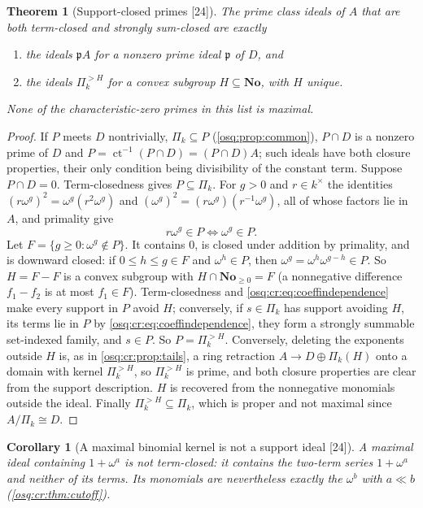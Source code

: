 \documentclass[11pt,letterpaper]{article}
\numberwithin{equation}{section}
\newtheorem{theorem}{Theorem}[section]
\newtheorem{corollary}[corollary]{Corollary}
\theoremstyle{definition}
\theoremstyle{remark}
\theoremstyle{plain}
\newcommand{\No}{\mathbf{No}}
\newcommand{\ct}{\operatorname{ct}}
\newcommand{\src}[1]{\textup{\textsf{[#1]}}}
\begin{document}
\begin{theorem}[Support-closed primes \src{24}]\label{osq:cr:thm:termprimes}
The prime class ideals of $A$ that are both term-closed and strongly sum-closed are exactly
\begin{enumerate}
\item the ideals $\mathfrak pA$ for a nonzero prime ideal $\mathfrak p$ of $D$, and
\item the ideals $\Pi_k^{>H}$ for a convex subgroup $H\subseteq\No$, with $H$ unique.
\end{enumerate}
None of the characteristic-zero primes in this list is maximal.
\end{theorem}
\begin{proof}
If $P$ meets $D$ nontrivially, $\Pi_k\subseteq P$ (\cref{osq:prop:common}), $P\cap D$ is a nonzero prime of $D$ and $P=\ct^{-1}(P\cap D)=(P\cap D)A$;
such ideals have both closure properties, their only condition being divisibility of the constant term. Suppose $P\cap D=0$. Term-closedness gives
$P\subseteq\Pi_k$. For $g>0$ and $r\in k^\times$ the identities $(r\omega^g)^2=\omega^g(r^2\omega^g)$ and $(\omega^g)^2=(r\omega^g)(r^{-1}\omega^g)$, all of
whose factors lie in $A$, and primality give
\begin{equation}\label{osq:cr:eq:coeffindependence}
 r\omega^g\in P\iff\omega^g\in P .
\end{equation}
Let $F=\{g\ge0:\omega^g\notin P\}$. It contains $0$, is closed under addition by primality, and is downward closed: if $0\le h\le g\in F$ and
$\omega^h\in P$, then $\omega^g=\omega^h\omega^{g-h}\in P$. So $H=F-F$ is a convex subgroup with $H\cap\No_{\ge0}=F$ (a nonnegative difference $f_1-f_2$ is
at most $f_1\in F$). Term-closedness and \eqref{osq:cr:eq:coeffindependence} make every support in $P$ avoid $H$; conversely, if $s\in\Pi_k$ has support
avoiding $H$, its terms lie in $P$ by \eqref{osq:cr:eq:coeffindependence}, they form a strongly summable set-indexed family, and $s\in P$. So
$P=\Pi_k^{>H}$. Conversely, deleting the exponents outside $H$ is, as in \cref{osq:cr:prop:tails}, a ring retraction $A\to D\oplus\Pi_k(H)$ onto a domain
with kernel $\Pi_k^{>H}$, so $\Pi_k^{>H}$ is prime, and both closure properties are clear from the support description. $H$ is recovered from the
nonnegative monomials outside the ideal. Finally $\Pi_k^{>H}\subseteq\Pi_k$, which is proper and not maximal since $A/\Pi_k\cong D$.
\end{proof}

\begin{corollary}[A maximal binomial kernel is not a support ideal \src{24}]\label{osq:cr:cor:notsupport}
A maximal ideal containing $1+\omega^a$ is not term-closed: it contains the two-term series $1+\omega^a$ and neither of its terms. Its monomials are
nevertheless exactly the $\omega^b$ with $a\ll b$ (\cref{osq:cr:thm:cutoff}).
\end{corollary}
\end{document}
